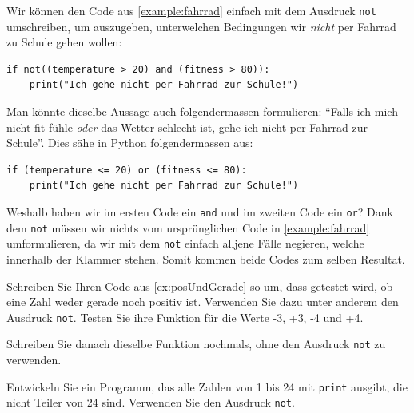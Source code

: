 \begin{myexample}
Wir können den Code aus \cref{example:fahrrad} einfach mit dem Ausdruck \lstinline|not| umschreiben, um auszugeben, unterwelchen Bedingungen wir \textit{nicht} per Fahrrad zu Schule gehen wollen:
\begin{lstlisting}
if not((temperature > 20) and (fitness > 80)):
	print("Ich gehe nicht per Fahrrad zur Schule!")
\end{lstlisting}
Man könnte dieselbe Aussage auch folgendermassen formulieren: ``Falls ich mich nicht fit fühle \textit{oder} das Wetter schlecht ist, gehe ich nicht per Fahrrad zur Schule''. Dies sähe in Python folgendermassen aus:
\begin{lstlisting}
if (temperature <= 20) or (fitness <= 80):
	print("Ich gehe nicht per Fahrrad zur Schule!")
\end{lstlisting}
Weshalb haben wir im ersten Code ein \lstinline|and| und im zweiten Code ein \lstinline|or|? Dank dem \lstinline|not| müssen wir nichts vom ursprünglichen Code in \cref{example:fahrrad} umformulieren, da wir mit dem \lstinline|not| einfach alljene Fälle negieren, welche innerhalb der Klammer stehen. Somit kommen beide Codes zum selben Resultat.
\end{myexample}

\begin{myexercise}
	Schreiben Sie Ihren Code aus \cref{ex:posUndGerade} so um, dass getestet wird, ob eine Zahl weder gerade noch positiv ist. Verwenden Sie dazu unter anderem den Ausdruck \lstinline|not|. Testen Sie ihre Funktion für die Werte -3, +3, -4 und +4.

	Schreiben Sie danach dieselbe Funktion nochmals, ohne den Ausdruck \lstinline|not| zu verwenden.
	\begin{myanswer}
		
	\end{myanswer}
\end{myexercise}

\begin{myexercise}
	Entwickeln Sie ein Programm, das alle Zahlen von 1 bis 24 mit \lstinline|print| ausgibt, die nicht Teiler von 24 sind. Verwenden Sie den Ausdruck \lstinline|not|.
	\begin{myanswer}
		
	\end{myanswer}
\end{myexercise}

